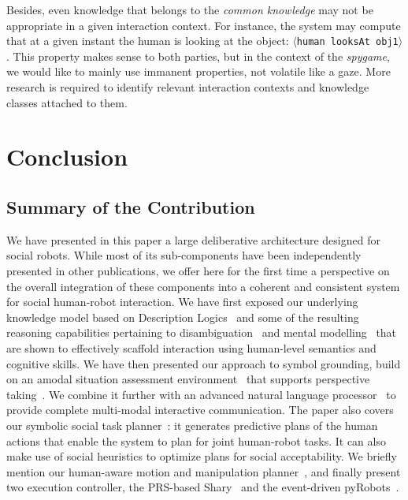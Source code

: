 \documentclass[preprint,3p,times]{elsarticle}
\newcommand{\stmt}[1]{{\footnotesize\tt$\langle$#1\relax$\rangle$}}
\begin{document}
Besides, even knowledge that belongs to the \emph{common knowledge} may not be
appropriate in a given interaction context. For instance, the system may
compute that at a given instant the human is looking at the object: \stmt{human
looksAt obj1}. This property makes sense to both parties, but in the context of
the \emph{spygame}, we would like to mainly use immanent properties, not
volatile like a gaze. More research is required to identify relevant
interaction contexts and knowledge classes attached to them.

\section{Conclusion}
\label{sect|conclusion}

\subsection{Summary of the Contribution}

We have presented in this paper a large deliberative architecture designed for
social robots. While most of its sub-components have been independently
presented in other publications, we offer here for the first time a perspective
on the overall integration of these components into a coherent and consistent
system for social human-robot interaction. We have first exposed our underlying
knowledge model based on Description Logics~\cite{Lemaignan2010} and some of the
resulting reasoning capabilities pertaining to disambiguation~\cite{Ros2010b}
and mental modelling~\cite{warnier2012when} that are shown to effectively
scaffold interaction using human-level semantics and cognitive skills. We have
then presented our approach to symbol grounding, build on an amodal situation
assessment environment~\cite{Sisbot2011} that supports perspective
taking~\cite{Marin2008,Ros2010}. We
combine it further with an advanced natural
language processor~\cite{Lemaignan2011a} to provide complete multi-modal interactive
communication.  The paper also covers our symbolic social task
planner~\cite{Alili2008, Alili2009, Lallement2014}: it generates predictive
plans of the human actions that enable the system to plan for joint human-robot
tasks. It can also make use of social heuristics to optimize plans for social
acceptability. We briefly mention our human-aware motion and manipulation
planner~\cite{Sisbot2008,Mainprice2011,Pandey2011}, and finally present two
execution controller, the PRS-based {\sc Shary}~\cite{clodic2008shary,fiore2014} and the
event-driven {\sc pyRobots}~\cite{lemaignan2015pyrobots}.
\end{document}
